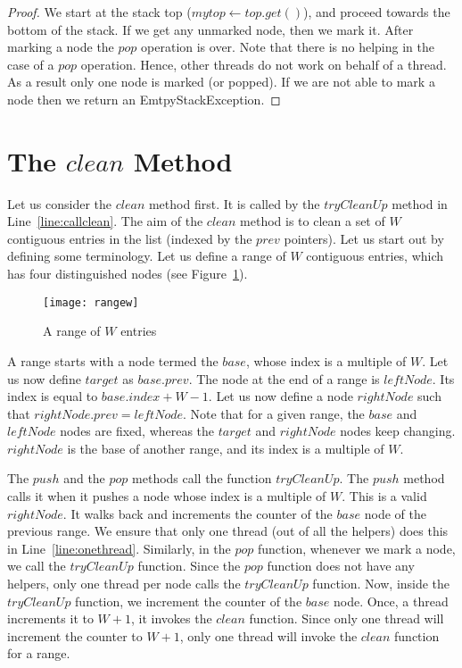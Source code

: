 \documentclass{llncs}
\begin{document}
\begin{appendix}
\begin{proof}
We start at the stack top ($mytop \leftarrow top.get()$), and proceed towards the
bottom of the stack. If we get any unmarked node, then we mark it. After marking a node
the $pop$ operation is over. Note that there is no helping in the case of a $pop$ 
operation. Hence, other threads do not work on behalf of a thread. As a result only
one node is marked (or popped). If we are not able to mark a node then we return
an EmtpyStackException. 
\end{proof}

\section{The $clean$ Method}




Let us consider the $clean$ method first. It is called by the $tryCleanUp$ method in Line~\ref{line:callclean}.
The aim of the $clean$ method is to clean a set of $W$ contiguous entries in the list (indexed by 
the $prev$ pointers). Let us start out by defining some terminology. Let us define a range of $W$ 
contiguous entries, which has
four distinguished nodes (see Figure~\ref{fig:rangewa}).

\begin{figure}[!htb]
\begin{center}
\texttt{[image: rangew]}
\caption{A range of $W$ entries \label{fig:rangewa} }
\end{center}
\end{figure}

A range starts with a node termed the $base$, whose index is a multiple of $W$. Let us now define
$target$ as $base.prev$. The node at the end of a range is $leftNode$. Its index is equal to 
$base.index + W - 1$. Let us now define a node $rightNode$ such that $rightNode.prev = leftNode$. 
Note that for a given range, the $base$ and $leftNode$ nodes are fixed, whereas the $target$ and
$rightNode$ nodes keep changing. $rightNode$ is the base of another range, and its index is
a multiple of $W$. 

The $push$ and the $pop$ methods call the function $tryCleanUp$. The $push$ method calls it when
it pushes a node whose index is a multiple of $W$. This is a valid $rightNode$. It walks back 
and increments the counter of the $base$ node of the previous range. We ensure that only one thread
(out of all the helpers) does this in Line~\ref{line:onethread}. Similarly, in the $pop$ function,
whenever we mark a node, we call the $tryCleanUp$ function. Since the $pop$ function does not
have any helpers, only one thread per node calls the $tryCleanUp$ function. Now, inside
the $tryCleanUp$ function, we increment the counter of the $base$ node. Once, a thread increments it to
 $W+1$,
it invokes the $clean$ function. Since only one thread will increment the counter to $W+1$, only one thread
will invoke the $clean$ function for a range. 




\end{appendix}
\end{document}
